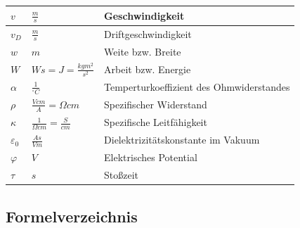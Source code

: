 \documentclass[12pt,a4paper]{article}%
\numberwithin{equation}{section}
\begin{document}
\begin{longtable} {|p{2cm}|p{3cm}|p{9cm}|}
$v$ & $\frac{m}{s}$ & Geschwindigkeit \\ \hline
$v_D$ & $\frac{m}{s}$ & Driftgeschwindigkeit \\ \hline
$w$ & $m$ & Weite bzw. Breite  \\ \hline
$W$ & $Ws = J = \frac{kgm^2}{s^2}$ & Arbeit bzw. Energie \\ \hline

$\alpha$ & $\frac{1}{^{\circ} C}$ & Temperturkoeffizient des Ohmwiderstandes \\ \hline
$\rho$ & $\frac{V cm}{A} = \Omega  cm$ & Spezifischer Widerstand \\ \hline
$\kappa$ & $\frac{1}{\Omega cm} = \frac{S}{cm}$ & Spezifische Leitfähigkeit \\ \hline
$\varepsilon_0$ & $\frac{As}{Vm}$ & Dielektrizitätskonstante im Vakuum \\ \hline
$\varphi$ & $V$ & Elektrisches Potential \\ \hline
$\tau$ & $s$ & Stoßzeit \\ \hline

\end{longtable}
\renewcommand{\arraystretch}{1}
\subsection{Formelverzeichnis}



\end{document}
